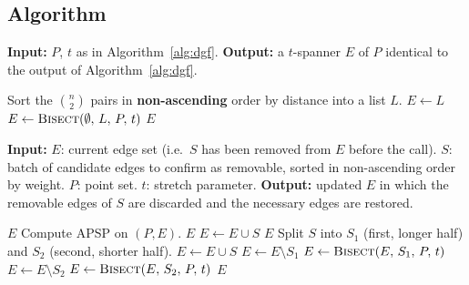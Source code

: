 \documentclass{article}
\begin{document}
\subsection{Algorithm}
\begin{algorithm}[h]
\caption{DGF with recursive binary search}
\label{alg:dgf-bisect-main}
\begin{algorithmic}[1]
\Statex \textbf{Input:} $P$, $t$ as in Algorithm~\ref{alg:dgf}.
\Statex \textbf{Output:} a $t$-spanner $E$ of $P$ identical to the output of Algorithm~\ref{alg:dgf}.

\State Sort the $\binom{n}{2}$ pairs in \textbf{non-ascending} order by distance into a list $L$.
\State $E \leftarrow L$
\State $E \leftarrow \textsc{Bisect}(\emptyset,\, L,\, P,\, t)$
\State \Return $E$
\end{algorithmic}
\end{algorithm}

\begin{algorithm}[h]
\caption{\textsc{Bisect}$(E,\,S,\,P,\,t)$}
\label{alg:bisect}
\begin{algorithmic}[1]
\Statex \textbf{Input:}
\Statex \hspace{1cm} $E$: current edge set (i.e.\ $S$ has been removed from $E$ before the call).
\Statex \hspace{1cm} $S$: batch of candidate edges to confirm as removable, sorted in non-ascending order by weight.
\Statex \hspace{1cm} $P$: point set.
\Statex \hspace{1cm} $t$: stretch parameter.
\Statex \textbf{Output:} updated $E$ in which the removable edges of $S$ are discarded and the necessary edges are restored.

    \State \Return $E$
\EndIf
\State Compute APSP on $(P,E)$.
    \State \Return $E$ 
\EndIf
{}
    \State $E \leftarrow E \cup S$ 
    \State \Return $E$
\EndIf
\State Split $S$ into $S_1$ (first, longer half) and $S_2$ (second, shorter half).
\State $E \leftarrow E \cup S$ 
\State $E \leftarrow E \setminus S_1$
\State $E \leftarrow \textsc{Bisect}(E,\, S_1,\, P,\, t)$
\State $E \leftarrow E \setminus S_2$
\State $E \leftarrow \textsc{Bisect}(E,\, S_2,\, P,\, t)$
\State \Return $E$
\end{algorithmic}
\end{algorithm}
\end{document}
